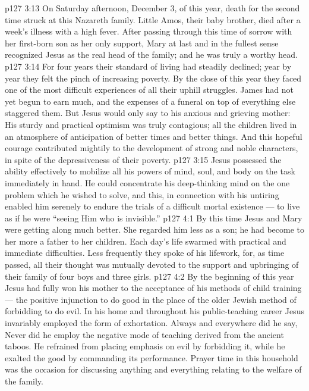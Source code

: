 \vs p127 3:13 \pc On Saturday afternoon, December 3, of this year, death for the second time struck at this Nazareth family. Little Amos, their baby brother, died after a week’s illness with a high fever. After passing through this time of sorrow with her first\hyp{}born son as her only support, Mary at last and in the fullest sense recognized Jesus as the real head of the family; and he was truly a worthy head.
\vs p127 3:14 For four years their standard of living had steadily declined; year by year they felt the pinch of increasing poverty. By the close of this year they faced one of the most difficult experiences of all their uphill struggles. James had not yet begun to earn much, and the expenses of a funeral on top of everything else staggered them. But Jesus would only say to his anxious and grieving mother:  His sturdy and practical optimism was truly contagious; all the children lived in an atmosphere of anticipation of better times and better things. And this hopeful courage contributed mightily to the development of strong and noble characters, in spite of the depressiveness of their poverty.
\vs p127 3:15 Jesus possessed the ability effectively to mobilize all his powers of mind, soul, and body on the task immediately in hand. He could concentrate his deep\hyp{}thinking mind on the one problem which he wished to solve, and this, in connection with his untiring  enabled him serenely to endure the trials of a difficult mortal existence --- to live as if he were “seeing Him who is invisible.”
\vs p127 4:1 By this time Jesus and Mary were getting along much better. She regarded him less as a son; he had become to her more a father to her children. Each day’s life swarmed with practical and immediate difficulties. Less frequently they spoke of his lifework, for, as time passed, all their thought was mutually devoted to the support and upbringing of their family of four boys and three girls.
\vs p127 4:2 By the beginning of this year Jesus had fully won his mother to the acceptance of his methods of child training --- the positive injunction to do good in the place of the older Jewish method of forbidding to do evil. In his home and throughout his public\hyp{}teaching career Jesus invariably employed the  form of exhortation. Always and everywhere did he say,  Never did he employ the negative mode of teaching derived from the ancient taboos. He refrained from placing emphasis on evil by forbidding it, while he exalted the good by commanding its performance. Prayer time in this household was the occasion for discussing anything and everything relating to the welfare of the family.
